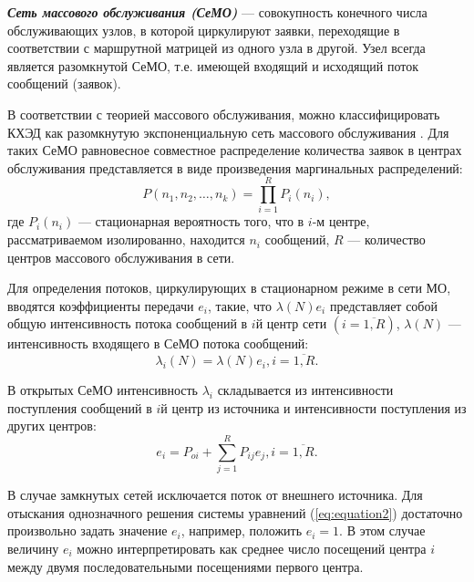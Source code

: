 \vspace{\baselineskip}
\textbf{\textit{Сеть массового обслуживания (СеМО)}} --- совокупность конечного числа обслуживающих узлов, в которой циркулируют заявки, переходящие в соответствии с маршрутной матрицей из одного узла в другой. Узел всегда является разомкнутой СеМО, т.е. имеющей входящий и исходящий поток сообщений (заявок).

\vspace{\baselineskip}
В соответствии с теорией массового обслуживания, можно классифицировать КХЭД как разомкнутую экспоненциальную сеть массового обслуживания \cite{bykov}. Для таких СеМО равновесное совместное распределение количества заявок в центрах обслуживания представляется в виде произведения маргинальных распределений:
\begin{equation}
  \label{eq:equation1}
  P(n_1,n_2,\ldots,n_k) = \prod_{i=1}^R P_i(n_i),
\end{equation}
где $P_i(n_i)$ --- стационарная вероятность того, что в $i$-м центре, рассматриваемом изолированно, находится  $n_i$ сообщений, $R$ --- количество центров массового обслуживания в сети.

\vspace{\baselineskip}
Для определения потоков, циркулирующих в стационарном режиме в сети МО, вводятся коэффициенты передачи  $e_i$, такие, что $\lambda(N)e_i$ представляет собой общую интенсивность потока сообщений в $i$\ndash й центр сети $(i=\overline{1,R})$, $\lambda(N)$ --- интенсивность входящего в СеМО потока сообщений:
\begin{equation}
  \label{eq:transmission}
\lambda_i(N)=\lambda(N)e_i, i=\overline{1,R}.
\end{equation}

В открытых СеМО интенсивность  $\lambda_i$ складывается из интенсивности поступления сообщений в $i$\ndash й центр из источника и интенсивности поступления из других центров:
\begin{equation}
  \label{eq:equation2}
e_i = P_{oi} + \sum_{j=1}^R P_{ij}e_j, i=\overline{1,R}.
\end{equation}

В случае замкнутых сетей исключается поток от внешнего источника. Для отыскания однозначного решения системы уравнений (\ref{eq:equation2}) достаточно произвольно задать значение $e_i$, например, положить $e_i=1$. В этом случае величину $e_i$ можно интерпретировать как среднее число посещений центра $i$ между двумя последовательными посещениями первого центра.

